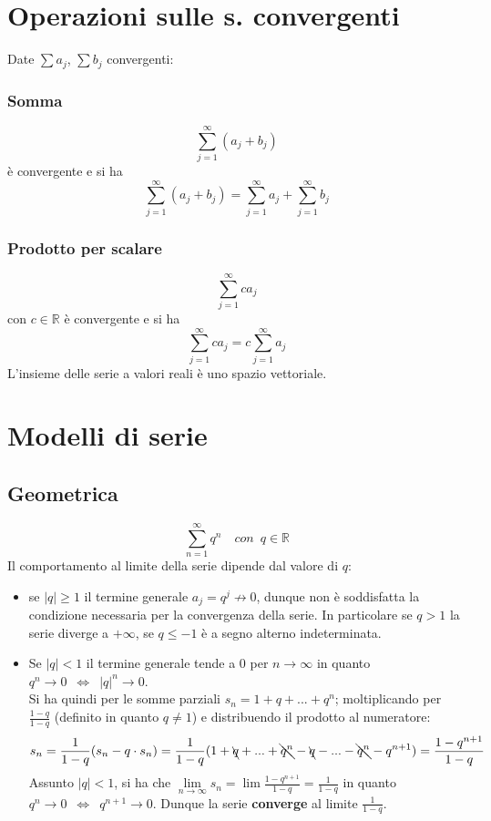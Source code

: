 \documentclass[10pt, oneside]{book}
\theoremstyle{plain}
\begin{document}
\section{Operazioni sulle s. convergenti}
Date $\sum a_j$, $\sum b_j$ convergenti:
\subsubsection*{Somma}
\[\sum \limits_{j = 1}^{\infty} (a_j + b_j)\]
è convergente e si ha 
\[\sum \limits_{j = 1}^{\infty} (a_j + b_j) = \sum \limits_{j = 1}^{\infty} a_j + \sum \limits_{j = 1}^{\infty} b_j\]
\subsubsection{Prodotto per scalare}
\[\sum \limits_{j = 1}^{\infty} c a_j\]
con $c \in \mathbb{R}$ è convergente e si ha
\[\sum \limits_{j = 1}^{\infty} c a_j = c \sum \limits_{j = 1}^{\infty} a_j\]
L'insieme delle serie a valori reali è uno spazio vettoriale.

\section{Modelli di serie}

\subsection{Geometrica}
\[\sum \limits_{n=1}^{\infty} q^n \quad con \enspace q \in \mathbb{R}\]
Il comportamento al limite della serie dipende dal valore di $q$:
\begin{itemize}[label=$\ast$]
    \item se $|q| \geq 1$ il termine generale $a_j = q^j \nrightarrow 0$, dunque non è soddisfatta la condizione necessaria per la convergenza della serie.
    In particolare se $q > 1$ la serie diverge a $+ \infty$, se $q \leq -1$ è a segno alterno indeterminata.
    \item Se $|q| < 1$ il termine generale tende a 0 per $n \rightarrow \infty$ in quanto $q^n \rightarrow 0 \enspace \Leftrightarrow \enspace |q|^n \rightarrow 0$.
    \\Si ha quindi per le somme parziali $s_n = 1 + q + ... + q^n$; moltiplicando per $\frac{1 - q}{1 - q}$ (definito in quanto $q \neq 1$) e distribuendo il prodotto al numeratore:
    \[s_n = \frac{1}{1 -q} (s_n - q \cdot s_n) = \frac{1}{1 -q} (1 + \bcancel{q} + ... + \bcancel{q^n} - \bcancel{q} - ... - \bcancel{q^{n}} - q^{n+1}) = \frac{1 - q^{n+1}}{1 - q}\]
    Assunto $|q| < 1$, si ha che $\lim \limits_{n \rightarrow \infty} s_n = \lim \frac{1 - q^{n+1}}{1 - q} = \frac{1}{1 - q}$ in quanto $q^n \rightarrow 0 \enspace \Leftrightarrow \enspace q^{n+1} \rightarrow 0$. Dunque la serie \textbf{converge} al limite $\frac{1}{1-q}$.
\end{itemize}
\end{document}
